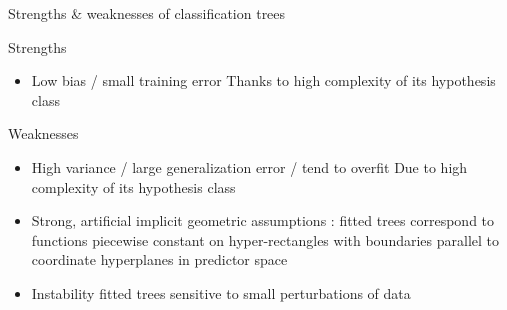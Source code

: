 

\begin{frame}{\Large Strengths \& weaknesses of classification trees}

\vskip 0.5cm

\scriptsize
\pause
{\large Strengths}
\vskip 0.05cm
\begin{itemize}
\item
	{\normalsize Low bias / small training error}
	\vskip 0.1cm
	Thanks to high complexity of its hypothesis class
\end{itemize}

\vskip 0.5cm
\pause
{\large Weaknesses}
\vskip 0.05cm
\begin{itemize}
\pause
\item
	{\normalsize High variance / large generalization error / tend to overfit}
	\vskip 0.1cm
	Due to high complexity of its hypothesis class

\vskip 0.3cm
\pause
\item
	{\normalsize Strong, artificial implicit geometric assumptions :}
	\vskip 0.1cm
	fitted trees correspond to functions piecewise constant on hyper-rectangles with boundaries
	parallel to coordinate hyperplanes in predictor space
	
\vskip 0.3cm
\pause
\item
	{\normalsize Instability}
	\vskip 0.1cm
	fitted trees sensitive to small perturbations of data
\end{itemize}

\end{frame}
\normalsize



